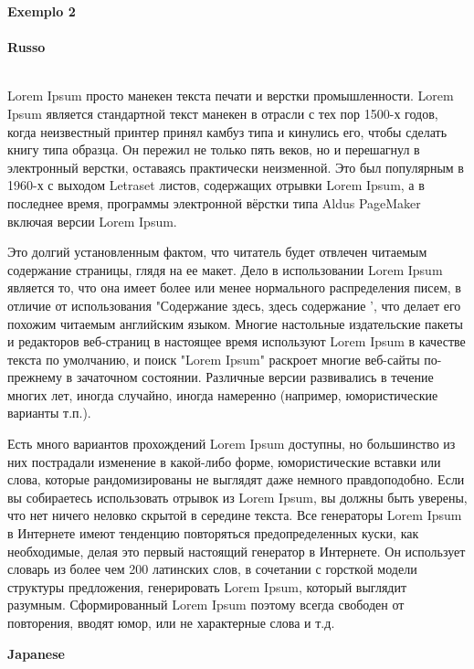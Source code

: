 \documentclass[UTF8,nofonts]{ctexart}
\begin{document}
\textbf{\huge{}Exemplo 2}\\\\

\textbf{\huge{}Russo}\\\\

\par
Lorem Ipsum просто манекен текста печати и верстки промышленности. Lorem Ipsum является стандартной текст манекен в отрасли с тех пор 1500-х годов, когда неизвестный принтер принял камбуз типа и кинулись его, чтобы сделать книгу типа образца. Он пережил не только пять веков, но и перешагнул в электронный верстки, оставаясь практически неизменной. Это был популярным в 1960-х с выходом Letraset листов, содержащих отрывки Lorem Ipsum, а в последнее время, программы электронной вёрстки типа Aldus PageMaker включая версии Lorem Ipsum.

Это долгий установленным фактом, что читатель будет отвлечен читаемым содержание страницы, глядя на ее макет. Дело в использовании Lorem Ipsum является то, что она имеет более или менее нормального распределения писем, в отличие от использования "Содержание здесь, здесь содержание ', что делает его похожим читаемым английским языком. Многие настольные издательские пакеты и редакторов веб-страниц в настоящее время используют Lorem Ipsum в качестве текста по умолчанию, и поиск "Lorem Ipsum" раскроет многие веб-сайты по-прежнему в зачаточном состоянии. Различные версии развивались в течение многих лет, иногда случайно, иногда намеренно (например, юмористические варианты т.п.).

Есть много вариантов прохождений Lorem Ipsum доступны, но большинство из них пострадали изменение в какой-либо форме, юмористические вставки или слова, которые рандомизированы не выглядят даже немного правдоподобно. Если вы собираетесь использовать отрывок из Lorem Ipsum, вы должны быть уверены, что нет ничего неловко скрытой в середине текста. Все генераторы Lorem Ipsum в Интернете имеют тенденцию повторяться предопределенных куски, как необходимые, делая это первый настоящий генератор в Интернете. Он использует словарь из более чем 200 латинских слов, в сочетании с горсткой модели структуры предложения, генерировать Lorem Ipsum, который выглядит разумным. Сформированный Lorem Ipsum поэтому всегда свободен от повторения, вводят юмор, или не характерные слова и т.д.\\

\par
\textbf{\huge{}Japanese}\\\\
\end{document}
